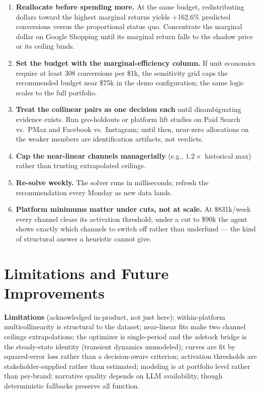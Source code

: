 \documentclass[11pt]{article}
\begin{document}
\begin{enumerate}[nosep]
  \item \textbf{Reallocate before spending more.} At the same budget, redistributing dollars toward the highest marginal returns yields +162.6\% predicted conversions versus the proportional status quo. Concentrate the marginal dollar on Google Shopping until its marginal return falls to the shadow price or its ceiling binds.
  \item \textbf{Set the budget with the marginal-efficiency column.} If unit economics require at least 308 conversions per \$1k, the sensitivity grid caps the recommended budget near \$75k in the demo configuration; the same logic scales to the full portfolio.
  \item \textbf{Treat the collinear pairs as one decision each} until disambiguating evidence exists. Run geo-holdouts or platform lift studies on Paid Search vs.\ PMax and Facebook vs.\ Instagram; until then, near-zero allocations on the weaker members are identification artifacts, not verdicts.
  \item \textbf{Cap the near-linear channels managerially} (e.g., $1.2\times$ historical max) rather than trusting extrapolated ceilings.
  \item \textbf{Re-solve weekly.} The solver runs in milliseconds; refresh the recommendation every Monday as new data lands.
  \item \textbf{Platform minimums matter under cuts, not at scale.} At \$831k/week every channel clears its activation threshold; under a cut to \$90k the agent shows exactly which channels to switch off rather than underfund --- the kind of structural answer a heuristic cannot give.
\end{enumerate}

\section{Limitations and Future Improvements}

\textbf{Limitations} (acknowledged in-product, not just here): within-platform multicollinearity is structural to the dataset; near-linear fits make two channel ceilings extrapolations; the optimizer is single-period and the adstock bridge is the steady-state identity (transient dynamics unmodeled); curves are fit by squared-error loss rather than a decision-aware criterion; activation thresholds are stakeholder-supplied rather than estimated; modeling is at portfolio level rather than per-brand; narrative quality depends on LLM availability, though deterministic fallbacks preserve all function.
\end{document}
